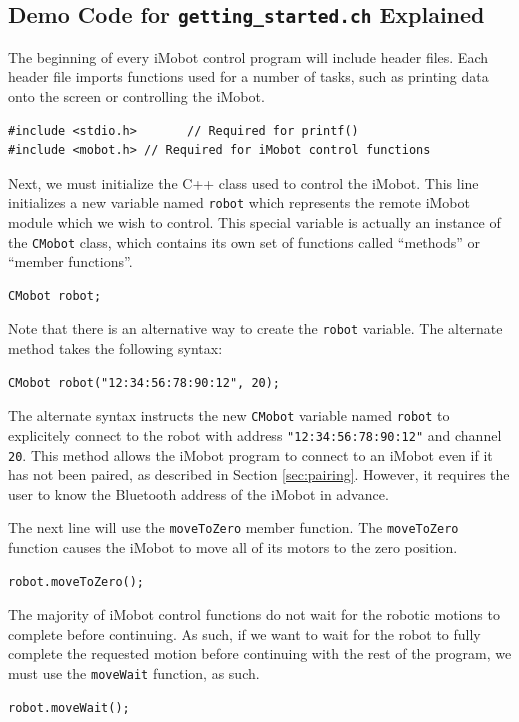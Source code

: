 \documentclass{article}
\begin{document}
\subsection{\label{sec:democode}Demo Code for \texttt{getting\_started.ch} Explained}
The beginning of every iMobot control program will include header files. Each
header file imports functions used for a number of tasks, such as printing
data onto the screen or controlling the iMobot. 

\begin{verbatim}
#include <stdio.h>       // Required for printf()
#include <mobot.h> // Required for iMobot control functions
\end{verbatim}

Next, we must initialize the C++ class used to control the iMobot. This line
initializes a new variable named \texttt{robot} which represents the remote
iMobot module which we wish to control. This special variable is actually an
instance of the \texttt{CMobot} class, which contains its own set of
functions called ``methods'' or ``member functions''.
\begin{verbatim}
CMobot robot;
\end{verbatim}
Note that there is an alternative way to create the \texttt{robot} variable.
The alternate method takes the following syntax:
\begin{verbatim}
CMobot robot("12:34:56:78:90:12", 20);
\end{verbatim}
The alternate syntax instructs the new \texttt{CMobot} variable named 
\texttt{robot} to explicitely connect to the robot with address
\texttt{"12:34:56:78:90:12"} and channel \texttt{20}. This method allows
the iMobot program to connect to an iMobot even if it has not been paired,
as described in Section \ref{sec:pairing}. However, it requires the user
to know the Bluetooth address of the iMobot in advance.

The next line will use the \texttt{moveToZero} member function. The
\texttt{moveToZero} function causes the iMobot to move all of its motors to the
zero position.
\begin{verbatim}
robot.moveToZero();
\end{verbatim}

The majority of iMobot control functions do not wait for the robotic motions to
complete before continuing. As such, if we want to wait for the robot to fully
complete the requested motion before continuing with the rest of the program,
we must use the \texttt{moveWait} function, as such.
\begin{verbatim}
robot.moveWait();
\end{verbatim}
\end{document}
